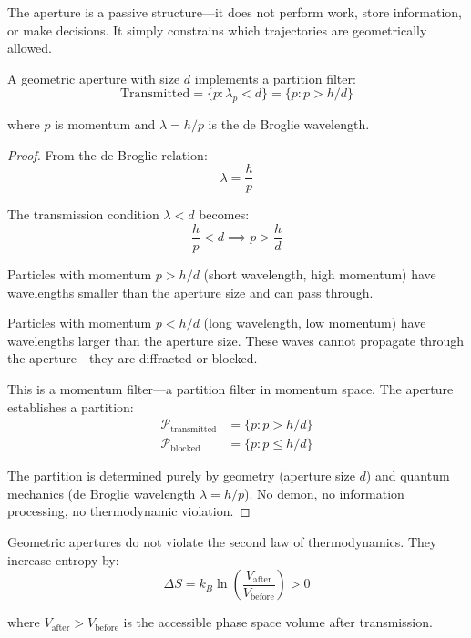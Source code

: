 The aperture is a passive structure—it does not perform work, store information, or make decisions. It simply constrains which trajectories are geometrically allowed.

\begin{theorem}
\label{thm:aperture_filter}
A geometric aperture with size $d$ implements a partition filter:
\begin{equation}
\text{Transmitted} = \{p : \lambda_p < d\} = \{p : p > h/d\}
\end{equation}

where $p$ is momentum and $\lambda = h/p$ is the de Broglie wavelength.
\end{theorem}

\begin{proof}
From the de Broglie relation:
\begin{equation}
\lambda = \frac{h}{p}
\end{equation}

The transmission condition $\lambda < d$ becomes:
\begin{equation}
\frac{h}{p} < d \implies p > \frac{h}{d}
\end{equation}

Particles with momentum $p > h/d$ (short wavelength, high momentum) have wavelengths smaller than the aperture size and can pass through.

Particles with momentum $p < h/d$ (long wavelength, low momentum) have wavelengths larger than the aperture size. These waves cannot propagate through the aperture—they are diffracted or blocked.

This is a momentum filter—a partition filter in momentum space. The aperture establishes a partition:
\begin{align}
\mathcal{P}_{\text{transmitted}} &= \{p : p > h/d\} \\
\mathcal{P}_{\text{blocked}} &= \{p : p \leq h/d\}
\end{align}

The partition is determined purely by geometry (aperture size $d$) and quantum mechanics (de Broglie wavelength $\lambda = h/p$). No demon, no information processing, no thermodynamic violation.
\end{proof}

\begin{corollary}
\label{cor:no_violation}
Geometric apertures do not violate the second law of thermodynamics. They increase entropy by:
\begin{equation}
\Delta S = k_B \ln\left(\frac{V_{\text{after}}}{V_{\text{before}}}\right) > 0
\end{equation}

where $V_{\text{after}} > V_{\text{before}}$ is the accessible phase space volume after transmission.
\end{corollary}

